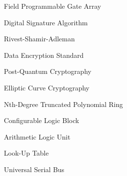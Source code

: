 \begin{nomenclature}
\begin{description}
\item{} Field Programmable Gate Array

\item{} Digital Signature Algorithm

\item{} Rivest-Shamir-Adleman

\item{} Data Encryption Standard

\item{} Post-Quantum Cryptography

\item{} Elliptic Curve Cryptography

\item{} Nth-Degree Truncated Polynomial Ring

\item{} Configurable Logic Block

\item{} Arithmetic Logic Unit

\item{} Look-Up Table

\item{} Universal Serial Bus
\end{description}
\end{nomenclature}

\cleardoublepage{} %
